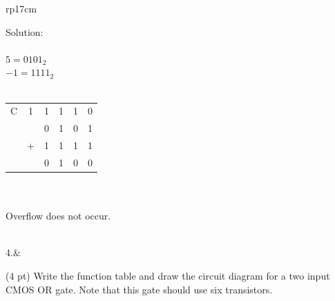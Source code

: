 \documentclass{article}
\begin{document}
\begin{longtable}[l]{rp{17cm}}
\begin{minipage}[t]{\linewidth}
Solution: \\
\\
$5 = 0101_2$\\
$-1 = 1111_2$\\
\\
\begin{tabular}{cccccc}
  C & 1 & 1 & 1 & 1 & 0 \\
    &   & 0 & 1 & 0 & 1 \\
    & + & 1 & 1 & 1 & 1 \\
  \hline
    &   & 0 & 1 & 0 & 0 \\
\end{tabular} \\
\\
Overflow does not occur.\\
\end{minipage}\\
\medskip
4.&\begin{minipage}[t]{\linewidth}(4 pt) Write the function table and draw the circuit diagram for a two input CMOS OR gate.  Note that this gate should use six transistors.\\ \\


\end{minipage}
\end{longtable}
\end{document}
